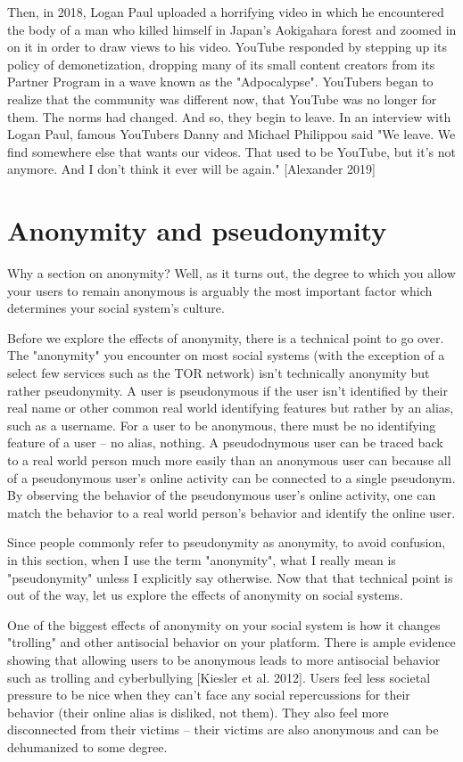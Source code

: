 \documentclass[class=book, crop=false]{standalone}
\begin{document}
Then, in 2018, Logan Paul uploaded a horrifying video in which he encountered the body of a man who killed himself in Japan's Aokigahara forest and zoomed in on it in order to draw views to his video. YouTube responded by stepping up its policy of demonetization, dropping many of its small content creators from its Partner Program in a wave known as the "Adpocalypse". YouTubers began to realize that the community was different now, that YouTube was no longer for them. The norms had changed. And so, they begin to leave. In an interview with Logan Paul, famous YouTubers Danny and Michael Philippou said "We leave. We find somewhere else that wants our videos. That used to be YouTube, but it's not anymore. And I don't think it ever will be again." [Alexander 2019]

\section{Anonymity and pseudonymity}

Why a section on anonymity? Well, as it turns out, the degree to which you allow your users to remain anonymous is arguably the most important factor which determines your social system's culture.

Before we explore the effects of anonymity, there is a technical point to go over. The "anonymity" you encounter on most social systems (with the exception of a select few services such as the TOR network) isn't technically anonymity but rather pseudonymity. A user is pseudonymous if the user isn't identified by their real name or other common real world identifying features but rather by an alias, such as a username. For a user to be anonymous, there must be no identifying feature of a user -- no alias, nothing. A pseudodnymous user can be traced back to a real world person much more easily than an anonymous user can because all of a pseudonymous user's online activity can be connected to a single pseudonym. By observing the behavior of the pseudonymous user's online activity, one can match the behavior to a real world person's behavior and identify the online user.

Since people commonly refer to pseudonymity as anonymity, to avoid confusion, in this section, when I use the term "anonymity", what I really mean is "pseudonymity" unless I explicitly say otherwise. Now that that technical point is out of the way, let us explore the effects of anonymity on social systems.

One of the biggest effects of anonymity on your social system is how it changes "trolling" and other antisocial behavior on your platform. There is ample evidence showing that allowing users to be anonymous leads to more antisocial behavior such as trolling and cyberbullying [Kiesler et al. 2012]. Users feel less societal pressure to be nice when they can't face any social repercussions for their behavior (their online alias is disliked, not them). They also feel more disconnected from their victims -- their victims are also anonymous and can be dehumanized to some degree.
\end{document}
